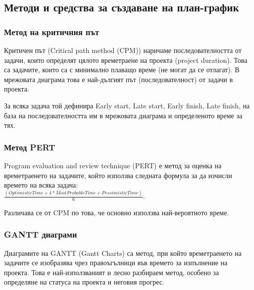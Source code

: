 \documentclass[fleqn,12pt]{article}
\begin{document}
\subsection{Методи и средства за създаване на план-график}

\subsubsection{Метод на критичния път}

Критичен път (Critical path method (CPM)) наричаме последователността от задачи, които определят цялото времетраене на проекта (project duration).
Това са задачите, които са с минимално плаващо време (не могат да се отлагат).
В мрежовата диаграма това е най-дългият път (последователност) от задачи в проекта.
\bigbreak

За всяка задача той дефинира Early start, Late start, Early finish, Late finish, на база на последователността им в мрежовата диаграма и определеното време за тях.

\subsubsection{Метод PERT}

Program evaluation and review technique (PERT) е метод за оценка на времетраенето на задачите, който използва следната формула за да изчисли времето на всяка задача: \\

$\frac{(OptimisticTime + 4 * MostProbableTime + PessimisticTime)}{6}$.

Различава се от CPM по това, че основно използва най-вероятното време.

\subsubsection{GANTT диаграми}

Диаграмите на GANTT (Gantt Charts) са метод, при който времетраенето на задачите се изобразява чрез правоъгълници във времето за изпълнение на проекта.
Това е най-използваният и лесно разбираем метод, особено за определяне на статуса на проекта и неговия прогрес.
\end{document}
